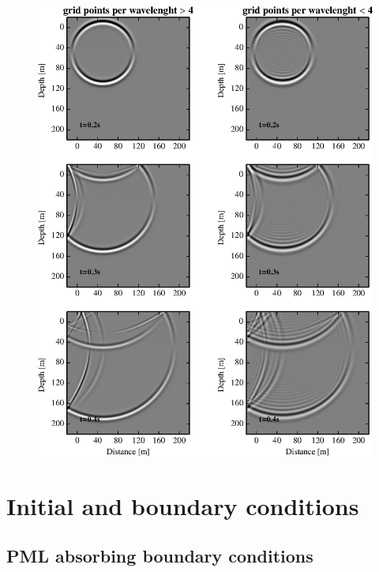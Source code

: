 \documentclass{gnulike}
\begin{document}
\begin{figure}[!ht]
  \centering
  \includegraphics[scale=1.0]{fig/validation_dispersion.eps}
\end{figure}

\section{Initial and boundary conditions}

\subsection{PML absorbing boundary conditions}

\cite{berenger1994perfectly}
\end{document}
